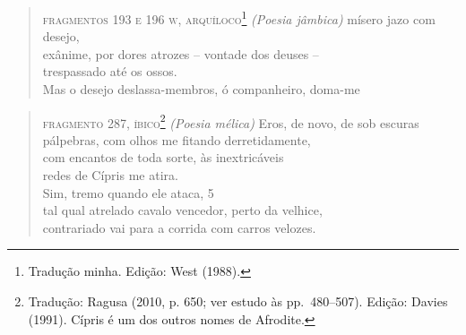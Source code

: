 \smallskip

\begin{verse}
\small{\textsc{fragmentos 193 e 196 w, arquíloco}\footnote{Tradução minha. Edição: West (1988).}
\textit{(Poesia jâmbica)}
\smallskip
\hspace*{4.5em}mísero jazo com desejo,\\
\hspace*{2em}exânime, por dores atrozes -- vontade dos deuses --\\
\hspace*{4.5em}trespassado até os ossos.\\

Mas o desejo deslassa-membros, ó companheiro, doma-me}
\end{verse}

\smallskip
\begin{verse}
\small{\textsc{fragmento 287, íbico}\footnote{Tradução: Ragusa (2010, p. 650; ver estudo às pp.~480--507). Edição: Davies (1991). Cípris é um dos outros nomes de Afrodite.}
\textit{(Poesia mélica)}
\smallskip
Eros, de novo, de sob escuras\\
pálpebras, com olhos me fitando derretidamente,\\ 
com encantos de toda sorte, às inextricáveis\\
redes de Cípris me atira.\\ %

Sim, tremo quando ele ataca, \num{5}\\
tal qual atrelado cavalo vencedor, perto da velhice,\\
contrariado vai para a corrida com carros velozes.}
\end{verse}

